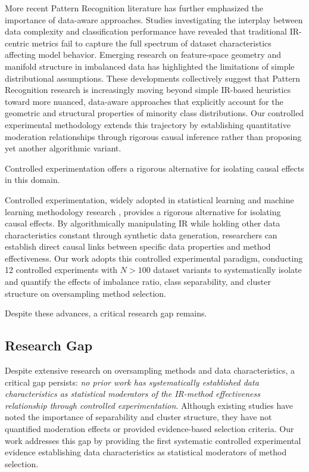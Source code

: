 \documentclass[12pt,a4paper]{article}
\theoremstyle{definition}
\begin{document}
More recent Pattern Recognition literature has further emphasized the importance of data-aware approaches. Studies investigating the interplay between data complexity and classification performance have revealed that traditional IR-centric metrics fail to capture the full spectrum of dataset characteristics affecting model behavior. Emerging research on feature-space geometry and manifold structure in imbalanced data has highlighted the limitations of simple distributional assumptions. These developments collectively suggest that Pattern Recognition research is increasingly moving beyond simple IR-based heuristics toward more nuanced, data-aware approaches that explicitly account for the geometric and structural properties of minority class distributions. Our controlled experimental methodology extends this trajectory by establishing quantitative moderation relationships through rigorous causal inference rather than proposing yet another algorithmic variant.

Controlled experimentation offers a rigorous alternative for isolating causal effects in this domain.

Controlled experimentation, widely adopted in statistical learning and machine learning methodology research \cite{demsar2006statistical,benavoli2016should}, provides a rigorous alternative for isolating causal effects. By algorithmically manipulating IR while holding other data characteristics constant through synthetic data generation, researchers can establish direct causal links between specific data properties and method effectiveness. Our work adopts this controlled experimental paradigm, conducting 12 controlled experiments with $N>100$ dataset variants to systematically isolate and quantify the effects of imbalance ratio, class separability, and cluster structure on oversampling method selection.

Despite these advances, a critical research gap remains.

\subsection{Research Gap}
\indent Despite extensive research on oversampling methods and data characteristics, a critical gap persists: \textit{no prior work has systematically established data characteristics as statistical moderators of the IR-method effectiveness relationship through controlled experimentation}. Although existing studies have noted the importance of separability and cluster structure, they have not quantified moderation effects or provided evidence-based selection criteria. Our work addresses this gap by providing the first systematic controlled experimental evidence establishing data characteristics as statistical moderators of method selection.
\end{document}
